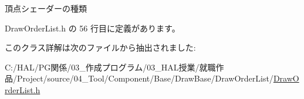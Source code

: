 頂点シェーダーの種類 



 Draw\+Order\+List.\+h の 56 行目に定義があります。



このクラス詳解は次のファイルから抽出されました\+:\begin{DoxyCompactItemize}
\item 
C\+:/\+H\+A\+L/\+P\+G関係/03\+\_\+作成プログラム/03\+\_\+\+H\+A\+L授業/就職作品/\+Project/source/04\+\_\+\+Tool/\+Component/\+Base/\+Draw\+Base/\+Draw\+Order\+List/\mbox{\hyperlink{_draw_order_list_8h}{Draw\+Order\+List.\+h}}\end{DoxyCompactItemize}
